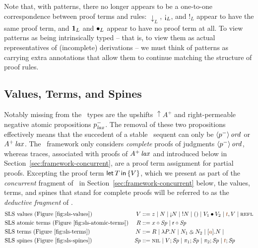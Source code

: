 Note that, with patterns, there no longer appears to be a one-to-one
correspondence between proof terms and rules: ${\downarrow}_L$,
${\gnab}_L$, and ${!}_L$ appear to have the same proof term, and
${\mathbf{1}}_L$ and ${\mathbin{\bullet}}_L$ appear to have no proof term at all. To
view patterns as being intrinsically typed -- that is, to view them as
actual representatives of (incomplete) derivations -- we must think of
patterns as carrying extra annotations that allow them to continue
matching the structure of proof rules.

\subsection{Values, Terms, and Spines}
\label{sec:framework-deductive}

Notably missing from the \sls~types are the upshifts ${\uparrow}A^+$
and right-permeable negative atomic propositions $p^-_{\it lax}$. The
removal of these two propositions effectively means that the succedent
of a stable \sls~sequent can only be ${\langle {p^-} \rangle}\,{{\it ord}}$ or
${A^+}\,{{\it lax}}$. The \sls~framework only considers {\it complete} proofs
of judgments ${\langle {p^-} \rangle}\,{{\it ord}}$, whereas traces, associated with
proofs of ${A^+}\,{{\it lax}}$ and introduced below in
Section~\ref{sec:framework-concurrent}, are a proof term assignment
for partial proofs. Excepting the proof term ${\sf let}\,{T}\,{\sf in}\,\{ {V} \}$, which we
present as part of the {\it concurrent} fragment of \sls~in
Section~\ref{sec:framework-concurrent} below, the values, terms, and
spines that stand for complete proofs will be referred to as the {\it
  deductive fragment} of \sls.
\begin{align*}
&\mbox{\sls~values (Figure~\ref{fig:sls-values})}& 
V & ::= z
   \mid N
   \mid \tgnabr{N}
   \mid \tbangr{N}
   \mid \toner
   \mid \tfuser{V_1}{V_2}
   \mid \texistsr{\lf{t}}{V}
   \mid \tunifr
\\
&\mbox{\sls~atomic terms (Figure~\ref{fig:sls-atomic-terms})}&
R & ::= \tfocusl{x}{\Sp} 
   \mid \tfocusl{\sf r}{\Sp} 
\\
&\mbox{\sls~terms (Figure~\ref{fig:sls-terms})}&
N & ::= R
   \mid \lambda P.N 
   \mid N_1 \with N_2
   \mid \tforallr{\lf{a}}{N}
   \mid 
\\
&\mbox{\sls~spines (Figure~\ref{fig:sls-spines})}&
\Sp & ::= \tnil 
   \mid V; \Sp
   \mid \pi_1; \Sp 
   \mid \pi_2; \Sp
   \mid \lf{t}; \Sp
\end{align*}

